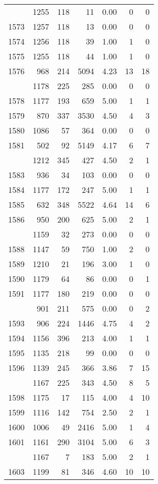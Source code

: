 \documentclass[
]{article}
\begin{document}
\begin{table}
\begin{tabular}[t]{lrrrrrr}
\addlinespace
1572 & 1255 & 118 & 11 & 0.00 & 0 & 0\\
1573 & 1257 & 118 & 13 & 0.00 & 0 & 0\\
1574 & 1256 & 118 & 39 & 1.00 & 1 & 0\\
1575 & 1255 & 118 & 44 & 1.00 & 1 & 0\\
1576 & 968 & 214 & 5094 & 4.23 & 13 & 18\\
\addlinespace
1577 & 1178 & 225 & 285 & 0.00 & 0 & 0\\
1578 & 1177 & 193 & 659 & 5.00 & 1 & 1\\
1579 & 870 & 337 & 3530 & 4.50 & 4 & 3\\
1580 & 1086 & 57 & 364 & 0.00 & 0 & 0\\
1581 & 502 & 92 & 5149 & 4.17 & 6 & 7\\
\addlinespace
1582 & 1212 & 345 & 427 & 4.50 & 2 & 1\\
1583 & 936 & 34 & 103 & 0.00 & 0 & 0\\
1584 & 1177 & 172 & 247 & 5.00 & 1 & 1\\
1585 & 632 & 348 & 5522 & 4.64 & 14 & 6\\
1586 & 950 & 200 & 625 & 5.00 & 2 & 1\\
\addlinespace
1587 & 1159 & 32 & 273 & 0.00 & 0 & 0\\
1588 & 1147 & 59 & 750 & 1.00 & 2 & 0\\
1589 & 1210 & 21 & 196 & 3.00 & 1 & 0\\
1590 & 1179 & 64 & 86 & 0.00 & 0 & 1\\
1591 & 1177 & 180 & 219 & 0.00 & 0 & 0\\
\addlinespace
1592 & 901 & 211 & 575 & 0.00 & 0 & 2\\
1593 & 906 & 224 & 1446 & 4.75 & 4 & 2\\
1594 & 1156 & 396 & 213 & 4.00 & 1 & 1\\
1595 & 1135 & 218 & 99 & 0.00 & 0 & 0\\
1596 & 1139 & 245 & 366 & 3.86 & 7 & 15\\
\addlinespace
1597 & 1167 & 225 & 343 & 4.50 & 8 & 5\\
1598 & 1175 & 17 & 115 & 4.00 & 4 & 10\\
1599 & 1116 & 142 & 754 & 2.50 & 2 & 1\\
1600 & 1006 & 49 & 2416 & 5.00 & 1 & 4\\
1601 & 1161 & 290 & 3104 & 5.00 & 6 & 3\\
\addlinespace
1602 & 1167 & 7 & 183 & 5.00 & 2 & 1\\
1603 & 1199 & 81 & 346 & 4.60 & 10 & 10\\

\end{tabular}
\end{table}
\end{document}
